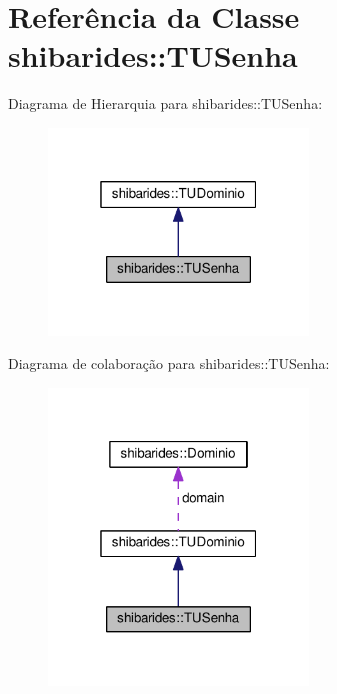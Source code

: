 \hypertarget{classshibarides_1_1TUSenha}{}\section{Referência da Classe shibarides\+:\+:T\+U\+Senha}
\label{classshibarides_1_1TUSenha}


Diagrama de Hierarquia para shibarides\+:\+:T\+U\+Senha\+:\nopagebreak
\begin{figure}[H]
\begin{center}
\leavevmode
\includegraphics[width=196pt]{classshibarides_1_1TUSenha__inherit__graph}
\end{center}
\end{figure}


Diagrama de colaboração para shibarides\+:\+:T\+U\+Senha\+:\nopagebreak
\begin{figure}[H]
\begin{center}
\leavevmode
\includegraphics[width=196pt]{classshibarides_1_1TUSenha__coll__graph}
\end{center}
\end{figure}

